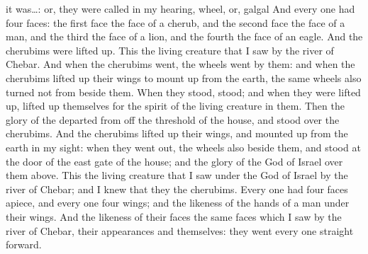 {{it was…: or, they were called in my hearing, wheel, or, galgal}
And every
one had
four
faces: the
first
face
{} the
face of a
cherub, and the
second
face
{} the
face of a
man, and the
third the
face of a
lion, and the
fourth the
face of an
eagle.
And the
cherubims were lifted
up. This
{} the living
creature that I
saw by the
river of
Chebar.
And when the
cherubims
went, the
wheels
went by
them: and when the
cherubims lifted
up their
wings to mount
up from the
earth, the same
wheels
also
turned not from
beside them.
When they
stood,
{}
stood; and when they were lifted
up,
{} lifted
up themselves
{} for the
spirit of the living
creature
{} in them.
Then the
glory of the
{}
departed from off the
threshold of the
house, and
stood over the
cherubims.
And the
cherubims lifted
up their
wings, and mounted
up from the
earth in my
sight: when they went
out, the
wheels also
{}
beside them, and
{}
stood at the
door of the
east
gate of the
{}
house; and the
glory of the
God of
Israel
{} over them
above.
This
{} the living
creature that I
saw under the
God of
Israel by the
river of
Chebar; and I
knew that they
{} the
cherubims.
Every
one had
four
faces
apiece, and every
one
four
wings; and the
likeness of the
hands of a
man
{} under their
wings.
And the
likeness of their
faces
{} the
same
faces which I
saw by the
river of
Chebar, their
appearances and themselves: they
went every
one
straight
forward.

}
